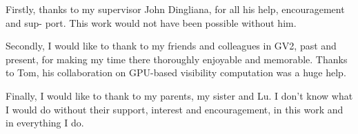 \documentclass[a4paper, 12pt, oneside]{report}         %
\begin{document}

\thesistitlepage                                  %

\thesisdeclarationpage				  %

\thesispermissionpage				  %

\thesisdedicationpage                             %

\begin{thesisacknowledgments}                     %
Firstly, thanks to my supervisor John Dingliana, for all his help, encouragement and sup-
port. This work would not have been possible without him.

Secondly, I would like to thank to my friends and colleagues in GV2, past and present,
for making my time there thoroughly enjoyable and memorable. Thanks to Tom, his
collaboration on GPU-based visibility computation was a huge help.

Finally, I would like to thank to my parents, my sister and Lu. I don't know what I would
do without their support, interest and encouragement, in this work and in everything I
do.
\end{thesisacknowledgments}                       %
\end{document}
